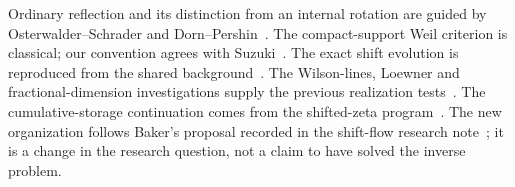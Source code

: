 Ordinary reflection and its distinction from an internal rotation
are guided by Osterwalder--Schrader and
Dorn--Pershin~\cite{OS,DP}. The compact-support Weil criterion is
classical; our convention agrees with Suzuki~\cite{Suzuki}.
The exact shift evolution is reproduced from the shared
background~\cite{SharedBackground}. The Wilson-lines, Loewner and
fractional-dimension investigations supply the previous realization
tests~\cite{ParentWilson,ParentLoewner,ParentFractional}.
The cumulative-storage continuation comes from the shifted-zeta
program~\cite{CumulativePath,AdaptivePath}. The new organization
follows Baker's proposal recorded in the shift-flow research
note~\cite{ShiftFlowNote}; it is a change in the research question,
not a claim to have solved the inverse problem.
